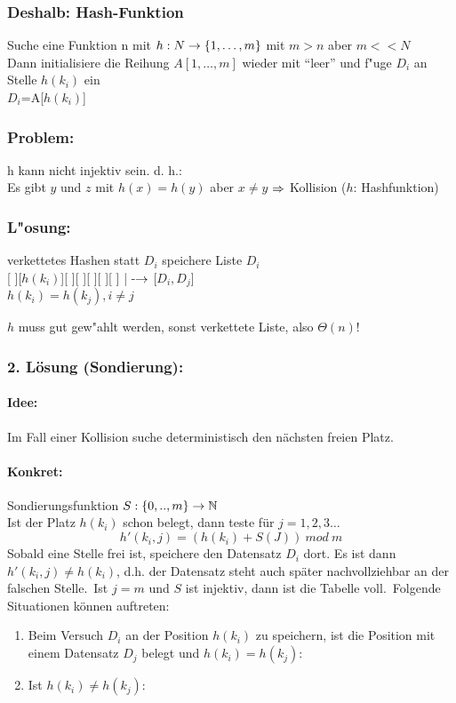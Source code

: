 \documentclass[a4paper]{scrartcl}
\begin{document}
		\subsubsection*{Deshalb: Hash-Funktion}		
		Suche eine Funktion n mit $h:N\rightarrow\{1,\dots,m\}$ mit $m>n$ aber $m<<N$\\
		Dann initialisiere die Reihung $A[1,\dots,m]$ wieder mit "`leer"' und f"uge $D_i$ an Stelle $h(k_i)$ ein \\
		$D_i$=A[$h(k_i)$]
		
		\subsubsection*{Problem:} 
		h kann nicht injektiv sein. d. h.:\\
		Es gibt $y$ und $z$ mit $h(x) = h(y)$ aber $x \ne y$ $\Rightarrow$ Kollision ($h$: Hashfunktion)\\
		\subsubsection*{L"osung:}
		verkettetes Hashen
		statt $D_i$ speichere Liste $D_i$\\
		[ ][$h(k_i)$][ ][ ][ ][ ][ ]
			|
			-$\rightarrow$ [$D_i,D_j$]\\
	$h(k_i)=h(k_j), i \ne j$

	$h$ muss gut gew"ahlt werden, sonst verkettete Liste, also $\Theta(n)$!


	\subsubsection*{2. Lösung (Sondierung):}
	\paragraph{Idee: } Im Fall einer Kollision suche deterministisch den nächsten freien Platz.
	\paragraph{Konkret: } Sondierungsfunktion $S: \{0,..,m\}\rightarrow \mathbb{N}$ \\
	Ist der Platz $h(k_i)$ schon belegt, dann teste für $j=1,2,3\ldots$ $$h'(k_i,j)=(h(k_i)+S(J))\ mod\ m$$
	Sobald eine Stelle frei ist, speichere den Datensatz $D_i$ dort. Es ist dann $h'(k_i,j)\ne h(k_i)$, d.h. der Datensatz steht auch später nachvollziehbar an der falschen Stelle.\
	Ist $j=m$ und $S$ ist injektiv, dann ist die Tabelle voll.\
	Folgende Situationen können auftreten:
	\begin{enumerate}
		\item Beim Versuch $D_i$ an der Position $h(k_i)$ zu speichern, ist die Position mit einem Datensatz $D_j$ belegt und $h(k_i)=h(k_j)$: 
		\item Ist $h(k_i)\ne h(k_j)$: 
	\end{enumerate}
\end{document}
